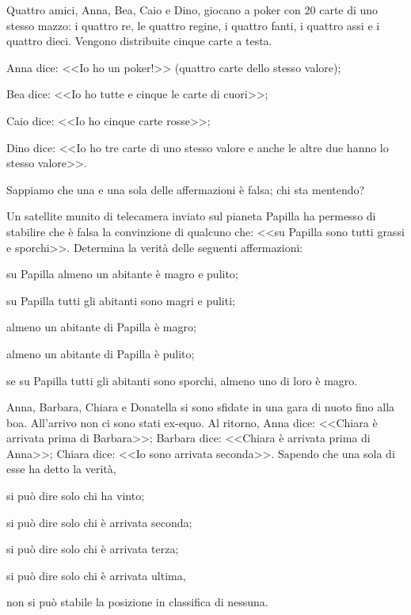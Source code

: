 \begin{esercizio}
\label{ese:6.20}
Quattro amici, Anna, Bea, Caio e Dino, giocano a poker con 20 carte
di uno stesso mazzo: i quattro re, le quattro regine, i quattro fanti,
i quattro assi e i quattro dieci. Vengono distribuite cinque carte a
testa. 
\begin{description*}
\item Anna dice: <<Io ho un poker!>> (quattro carte dello stesso valore);
\item Bea dice: <<Io ho tutte e cinque le carte di cuori>>;
\item Caio dice: <<Io ho cinque carte rosse>>;
\item Dino dice: <<Io ho tre carte di uno stesso valore e anche le altre due hanno lo stesso valore>>.
\end{description*}
Sappiamo che una e una sola delle affermazioni è falsa; chi sta mentendo?
\end{esercizio}
\pagebreak
\begin{esercizio}
\label{ese:6.21}
Un satellite munito di telecamera inviato sul pianeta Papilla ha
permesso di stabilire che è falsa la convinzione di qualcuno che: <<su
Papilla sono tutti grassi e sporchi>>. Determina la verità delle seguenti affermazioni:
\begin{enumeratea}
\item su Papilla almeno un abitante è magro e pulito;
\item su Papilla tutti gli abitanti sono magri e puliti;
\item almeno un abitante di Papilla è magro;
\item almeno un abitante di Papilla è pulito; 
\item se su Papilla tutti gli abitanti sono sporchi, almeno uno di loro è magro.
\end{enumeratea}
\end{esercizio}

\begin{esercizio}
\label{ese:6.22}
Anna, Barbara, Chiara e Donatella si sono sfidate in una gara di
nuoto fino alla boa. All'arrivo non ci sono stati
ex-equo. Al ritorno, Anna dice: <<Chiara è arrivata prima di Barbara>>;
Barbara dice: <<Chiara è arrivata prima di Anna>>; Chiara dice: <<Io sono
arrivata seconda>>. Sapendo che una sola di esse ha detto la verità, 
\begin{enumeratea}
\item si può dire solo chi ha vinto;
\item si può dire solo chi è arrivata seconda;
\item si può dire solo chi è arrivata terza;
\item si può dire solo chi è arrivata ultima, 
\item non si può stabile la posizione in classifica di nessuna.
\end{enumeratea}
\end{esercizio}

